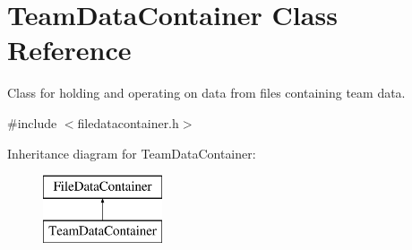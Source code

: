 \hypertarget{classTeamDataContainer}{}\section{Team\+Data\+Container Class Reference}
\label{classTeamDataContainer}


Class for holding and operating on data from files containing team data.  




{\ttfamily \#include $<$filedatacontainer.\+h$>$}

Inheritance diagram for Team\+Data\+Container\+:\begin{figure}[H]
\begin{center}
\leavevmode
\includegraphics[height=2.000000cm]{classTeamDataContainer}
\end{center}
\end{figure}
